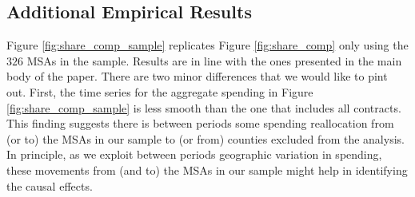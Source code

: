 \documentclass[dv_diss_main.tex]{subfiles}
\begin{document}
\subsection{Additional Empirical Results}\label{sec:app_empres}

Figure \ref{fig:share_comp_sample} replicates Figure \ref{fig:share_comp} only using the $326$ MSAs in the sample. Results are in line with the ones presented in the main body of the paper. There are two minor differences that we would like to pint out. First, the time series for the aggregate spending in Figure \ref{fig:share_comp_sample} is less smooth than the one that includes all contracts. This finding suggests there is between periods some spending reallocation from (or to) the MSAs in our sample to (or from) counties excluded from the analysis. In principle, as we exploit between periods geographic variation in spending, these movements from (and to) the MSAs in our sample might help in identifying the causal effects. 
\end{document}
